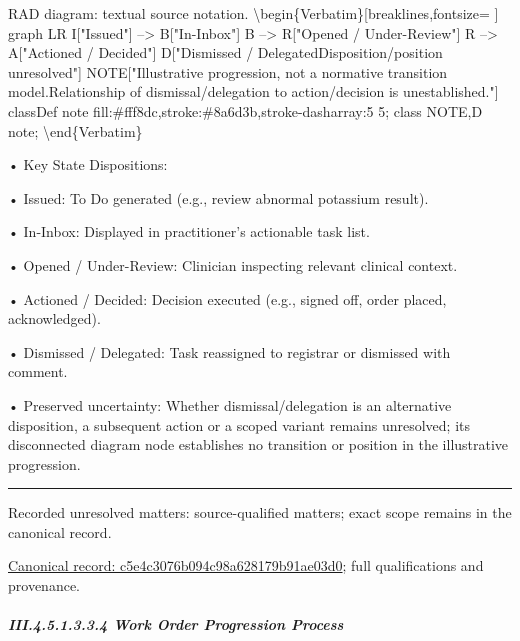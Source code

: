 RAD diagram: textual source notation.
\textbackslash{}begin\{Verbatim\}[breaklines,fontsize=
]
graph LR
    I["Issued"] --> B["In-Inbox"]
    B --> R["Opened / Under-Review"]
    R --> A["Actioned / Decided"]
    D["Dismissed / Delegated\newline{}Disposition/position unresolved"]
    NOTE["Illustrative progression, not a normative transition model.\newline{}Relationship of dismissal/delegation to action/decision is unestablished."]
    classDef note fill:\#fff8dc,stroke:\#8a6d3b,stroke-dasharray:5 5;
    class NOTE,D note;
\textbackslash{}end\{Verbatim\}



•
Key State Dispositions:



•
Issued: To Do generated (e.g., review abnormal potassium result).



•
In-Inbox: Displayed in practitioner's actionable task list.



•
Opened / Under-Review: Clinician inspecting relevant clinical context.



•
Actioned / Decided: Decision executed (e.g., signed off, order placed, acknowledged).



•
Dismissed / Delegated: Task reassigned to registrar or dismissed with comment.



•
Preserved uncertainty: Whether dismissal/delegation is an alternative disposition, a subsequent action or a scoped variant remains unresolved; its disconnected diagram node establishes no transition or position in the illustrative progression.



\medskip\hrule\medskip

{\small Recorded unresolved matters: source-qualified matters; exact scope remains in the canonical record.}\par
{\footnotesize \href{../../../../continuum/business/business-process/c5e4c3076b094c98a628179b91ae03d0.md}{Canonical record: c5e4c3076b094c98a628179b91ae03d0}; full qualifications and provenance.}\par
\subparagraph*{III.4.5.1.3.3.4 Work Order Progression Process}
\label{navigation:III.4.5.1.3.3.4}

